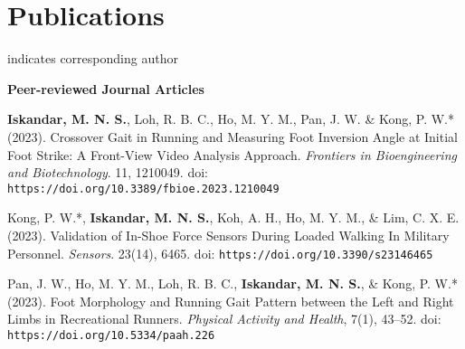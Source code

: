 \documentclass[../main.tex]{subfiles}
\begin{document}

\section{Publications} 
  \vspace{2pt}
  \resumeSubHeadingListStart
    \item
        \small \normalfont * indicates corresponding author
    \item
        \textbf{Peer-reviewed Journal Articles}  
        \def\labelprefix{J}
        \begin{etaremune}
            \item\label{article: frontiers foot inversion} {\textbf{Iskandar, M. N. S.}, Loh, R. B. C., Ho, M. Y. M., Pan, J. W. \& Kong, P. W.* (2023). Crossover Gait in Running and Measuring Foot Inversion Angle at Initial Foot Strike: A Front-View Video Analysis Approach. \textit{Frontiers in Bioengineering and Biotechnology}. 11, 1210049. doi: \nolinkurl{https://doi.org/10.3389/fbioe.2023.1210049} \href{https://doi.org/10.3389/fbioe.2023.1210049}{\faFilePdfO}} %
            
            \item\label{article: sensors validation exoskeletal} {Kong, P. W.*, \textbf{Iskandar, M. N. S.}, Koh, A. H., Ho, M. Y. M., \& Lim, C. X. E. (2023). Validation of In-Shoe Force Sensors During Loaded Walking In Military Personnel. \textit{Sensors}. 23(14), 6465. doi: \nolinkurl{https://doi.org/10.3390/s23146465} \href{https://doi.org/10.3390/s23146465}{\faFilePdfO}} %
            
            \item\label{article: paah foot morphology} {Pan, J. W., Ho, M. Y. M., Loh, R. B. C., \textbf{Iskandar, M. N. S.}, \& Kong, P. W.* (2023). Foot Morphology and Running Gait Pattern between the Left and Right Limbs in Recreational Runners. \textit{Physical Activity and Health}, 7(1), 43–52. doi: \nolinkurl{https://doi.org/10.5334/paah.226} \href{https://doi.org/10.5334/paah.226}{\faFilePdfO}} %
        \end{etaremune}
                
\end{document}
